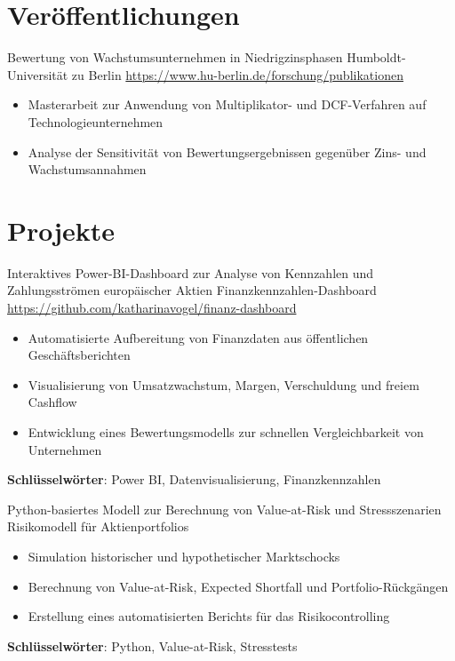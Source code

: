 \documentclass[a4paper, serif, 10pt]{moderncv}
\begin{document}
\section{Veröffentlichungen}

        {Bewertung von Wachstumsunternehmen in Niedrigzinsphasen}
        {Humboldt-Universität zu Berlin}
        {\url{https://www.hu-berlin.de/forschung/publikationen}}
        {}
        {\begin{itemize}
\item Masterarbeit zur Anwendung von Multiplikator- und DCF-Verfahren auf Technologieunternehmen
\item Analyse der Sensitivität von Bewertungsergebnissen gegenüber Zins- und Wachstumsannahmen
\end{itemize}}
\section{Projekte}

        {Interaktives Power-BI-Dashboard zur Analyse von Kennzahlen und Zahlungsströmen europäischer Aktien}
        {Finanzkennzahlen-Dashboard}
        {\url{https://github.com/katharinavogel/finanz-dashboard}}
        {}
        {\begin{itemize}
\item Automatisierte Aufbereitung von Finanzdaten aus öffentlichen Geschäftsberichten
\item Visualisierung von Umsatzwachstum, Margen, Verschuldung und freiem Cashflow
\item Entwicklung eines Bewertungsmodells zur schnellen Vergleichbarkeit von Unternehmen
\end{itemize}
\textbf{Schlüsselwörter}: Power BI, Datenvisualisierung, Finanzkennzahlen}

        {Python-basiertes Modell zur Berechnung von Value-at-Risk und Stressszenarien}
        {Risikomodell für Aktienportfolios}
        {}
        {}
        {\begin{itemize}
\item Simulation historischer und hypothetischer Marktschocks
\item Berechnung von Value-at-Risk, Expected Shortfall und Portfolio-Rückgängen
\item Erstellung eines automatisierten Berichts für das Risikocontrolling
\end{itemize}
\textbf{Schlüsselwörter}: Python, Value-at-Risk, Stresstests}
\end{document}

